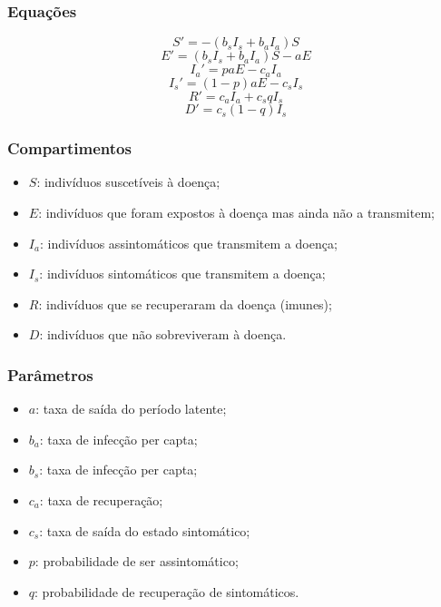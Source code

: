 \documentclass{article}
\begin{document}
\subsubsection{Equações}
\begin{equation}
    S' = -(b_s I_s + b_a I_a )S
\end{equation} \begin{equation}
    E' = (b_s I_s + b_a I_a )S - aE
\end{equation} \begin{equation}
    I_a ' = p a E - c_a I_a
\end{equation} \begin{equation}
    I_s ' = (1-p) a E - c_s I_s
\end{equation} \begin{equation}
    R' = c_a I_a + c_s q I_s
\end{equation} \begin{equation}
    D' = c_s (1 - q) I_s
\end{equation}

\subsubsection{Compartimentos}
\begin{itemize}
    \item $S$: indivíduos suscetíveis à doença;
    \item $E$: indivíduos que foram expostos à doença mas ainda não a transmitem;
    \item $I_a$: indivíduos assintomáticos que transmitem a doença;
    \item $I_s$: indivíduos sintomáticos que transmitem a doença;
    \item $R$: indivíduos que se recuperaram da doença (imunes);
    \item $D$: indivíduos que não sobreviveram à doença.
\end{itemize}
    
\subsubsection{Parâmetros}
\begin{itemize}
    \item $a$: taxa de saída do período latente;
    \item $b_a$: taxa de infecção per capta;
    \item $b_s$: taxa de infecção per capta;
    \item $c_a$: taxa de recuperação;
    \item $c_s$: taxa de saída do estado sintomático;
    \item $p$: probabilidade de ser assintomático;
    \item $q$: probabilidade de recuperação de sintomáticos.
\end{itemize}
\end{document}
